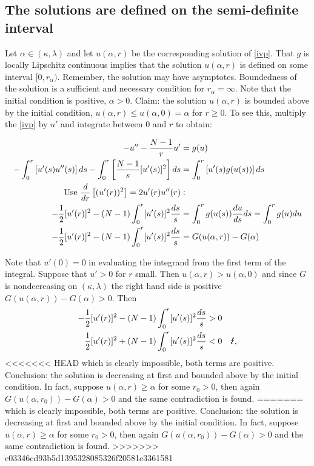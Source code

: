 \subsection{The solutions are defined on the semi-definite interval}\hfill\label{semidef}

Let $\alpha\in(\kappa,\lambda)$ and let $u(\alpha,r)$ be the corresponding solution of \eqref{ivp}. That $g$ is locally Lipschitz continuous implies that the solution $u(\alpha,r)$ is defined on some interval $[0,r_\alpha)$. Remember, the solution may have asymptotes. Boundedness of the solution is a sufficient and necessary condition for $r_\alpha=\infty$. Note that the initial condition is positive, $\alpha>0$. Claim: the solution $u(\alpha,r)$ is bounded above by the initial condition, $u(\alpha,r)\leq u(\alpha,0)=\alpha$ for $r\geq0$. To see this, multiply the \eqref{ivp} by $u'$ and integrate between 0 and $r$ to obtain:

\begin{align}\label{ivpint}
-u''-\frac{N-1}{r}u'&=g(u)\nonumber\\
-\int_0^r\left[u'(s)u''(s)\right]ds-\int_0^r\left[\frac{N-1}{s}[u'(s)]^2\right]ds&=\int_0^r\left[u'(s)g(u(s))\right]ds\nonumber\\
\notag\text{Use }\frac{d}{dr}\left[(u'(r))^2\right]=2u'(r)u''(r)&:\\
-\frac{1}{2}[u'(r)]^2-(N-1)\int_0^r[u'(s)]^2\frac{ds}{s}&=\int_0^r g(u(s))\frac{du}{ds}ds=\int_0^r g(u)du\nonumber\\
-\frac{1}{2}[u'(r)]^2-(N-1)\int_0^r[u'(s)]^2\frac{ds}{s}&=G(u(\alpha,r))-G(\alpha)
\end{align}

Note that $u'(0)=0$ in evaluating the integrand from the first term of the integral. Suppose that $u'>0$ for $r$ small. Then $u(\alpha,r)>u(\alpha,0)$ and since $G$ is nondecreasing on $(\kappa,\lambda)$ the right hand side is positive $G(u(\alpha,r))-G(\alpha)>0$. Then
\begin{align*}
-\frac{1}{2}[u'(r)]^2-(N-1)\int_0^r[u'(s)]^2\frac{ds}{s}&>0\\
\frac{1}{2}[u'(r)]^2+(N-1)\int_0^r[u'(s)]^2\frac{ds}{s}&<0\quad\text{\Lightning},
\end{align*}
<<<<<<< HEAD
which is clearly impossible, both terms are positive. Conclusion: the solution is decreasing at first and bounded above by the initial condition. In fact, suppose $u(\alpha,r)\geq\alpha$ for some $r_0>0$, then again $G(u(\alpha,r_0))-G(\alpha)>0$ and the same contradiction is found.
=======
which is clearly impossible, both terms are positive. Conclusion: the solution is decreasing at first and bounded above by the initial condition. In fact, suppose $u(\alpha,r)\geq\alpha$ for some $r_0>0$, then again $G(u(\alpha,r_0))-G(\alpha)>0$ and the same contradiction is found. 
>>>>>>> e03346cd93b5d1395328085326f20581e3361581

